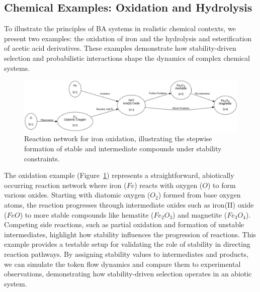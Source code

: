 \documentclass[entropy,article,submit,pdftex,moreauthors]{Definitions/mdpi}
\begin{document}
\subsection{Chemical Examples: Oxidation and Hydrolysis}

To illustrate the principles of BA systems in realistic chemical contexts, we present two examples: the oxidation of iron and the hydrolysis and esterification of acetic acid derivatives. These examples demonstrate how stability-driven selection and probabilistic interactions shape the dynamics of complex chemical systems.

\begin{figure}[h]
    \centering
    \includegraphics[width=1\textwidth]{abc_oxi.png}
    \caption{Reaction network for iron oxidation, illustrating the stepwise formation of stable and intermediate compounds under stability constraints.}
    \label{fig:abc_oxi}
\end{figure}

The oxidation example (Figure~\ref{fig:abc_oxi}) represents a straightforward, abiotically occurring reaction network where iron (\(Fe\)) reacts with oxygen (\(O\)) to form various oxides. Starting with diatomic oxygen (\(O_2\)) formed from base oxygen atoms, the reaction progresses through intermediate oxides such as iron(II) oxide (\(FeO\)) to more stable compounds like hematite (\(Fe_2O_3\)) and magnetite (\(Fe_3O_4\)). Competing side reactions, such as partial oxidation and formation of unstable intermediates, highlight how stability influences the progression of reactions. This example provides a testable setup for validating the role of stability in directing reaction pathways. By assigning stability values to intermediates and products, we can simulate the token flow dynamics and compare them to experimental observations, demonstrating how stability-driven selection operates in an abiotic system.
\end{document}

